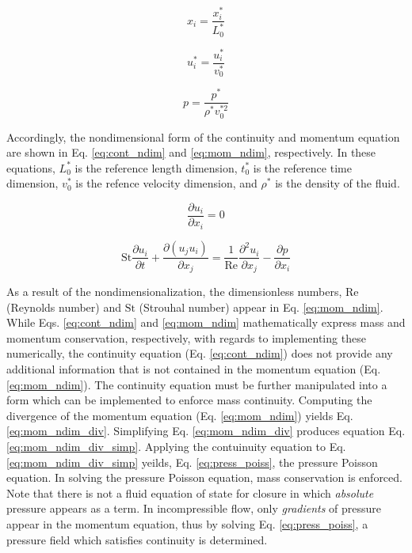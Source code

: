 \documentclass[10pt, letterpaper]{article}
\begin{document}
\begin{equation}
  x_{i} = \frac{x_{i}^{*}}{L_{0}^{*}}
  \label{eq:dist_ndim}
\end{equation}


\begin{equation}
  u_{i}^{*} = \frac{u_{i}^{*}}{v_{0}^{*}}
  \label{eq:vel_ndim}
\end{equation}


\begin{equation}
  p = \frac{p^{*}}{\rho^{*}v_{0}^{*2}}
  \label{eq:press_ndim}
\end{equation}

Accordingly, the nondimensional form of the continuity and momentum equation are shown in Eq. \ref{eq:cont_ndim} and \ref{eq:mom_ndim}, respectively. In these equations, $L_{0}^{*}$ is the reference length dimension, $t_{0}^{*}$ is the reference time dimension, $v_{0}^{*}$ is the refence velocity dimension, and $\rho^{*}$ is the density of the fluid.

\begin{equation}
  \frac{\partial{u_{i}}}{\partial{x_{i}}} = 0
  \label{eq:cont_ndim}
\end{equation}

\begin{equation}
  \boxed{
  \text{St}\frac{\partial{u_{i}}}{\partial{t}} + \frac{\partial{(u_{j}u_{i})}}{\partial{x_{j}}} =\frac{1}{\text{Re}}\frac{\partial^{2}{u_{i}}}{\partial{x_{j}}} - \frac{\partial{p}}{\partial{x_{i}}}
  \label{eq:mom_ndim}
  }
\end{equation}

As a result of the nondimensionalization, the dimensionless numbers, $\text{Re}$ (Reynolds number) and $\text{St}$ (Strouhal number) appear in Eq. \ref{eq:mom_ndim}. While Eqs. \ref{eq:cont_ndim} and \ref{eq:mom_ndim} mathematically express mass and momentum conservation, respectively, with regards to implementing these numerically, the continuity equation (Eq. \ref{eq:cont_ndim}) does not provide any additional information that is not contained in the momentum equation (Eq. \ref{eq:mom_ndim}). The continuity equation must be further manipulated into a form which can be implemented to enforce mass continuity. Computing the divergence of the momentum equation (Eq. \ref{eq:mom_ndim}) yields Eq. \ref{eq:mom_ndim_div}. Simplifying Eq. \ref{eq:mom_ndim_div} produces equation Eq. \ref{eq:mom_ndim_div_simp}. Applying the contuinuity equation to Eq. \ref{eq:mom_ndim_div_simp} yeilds, Eq. \ref{eq:press_poiss}, the pressure Poisson equation. In solving the pressure Poisson equation, mass conservation is enforced. Note that there is not a fluid equation of state for closure in which \textit{absolute} pressure appears as a term. In incompressible flow, only \textit{gradients} of pressure appear in the momentum equation, thus by solving Eq. \ref{eq:press_poiss}, a pressure field which satisfies continuity is determined.
\end{document}
